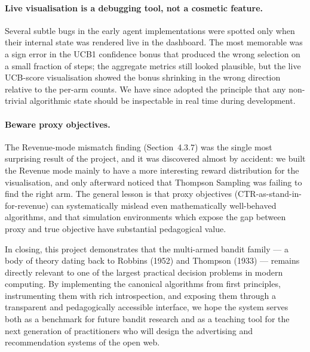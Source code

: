 \paragraph{Live visualisation is a debugging tool, not a cosmetic feature.}
Several subtle bugs in the early agent implementations were spotted only when their internal state was rendered live in the dashboard. The most memorable was a sign error in the UCB1 confidence bonus that produced the wrong selection on a small fraction of steps; the aggregate metrics still looked plausible, but the live UCB-score visualisation showed the bonus shrinking in the wrong direction relative to the per-arm counts. We have since adopted the principle that any non-trivial algorithmic state should be inspectable in real time during development.

\paragraph{Beware proxy objectives.}
The Revenue-mode mismatch finding (Section~4.3.7) was the single most surprising result of the project, and it was discovered almost by accident: we built the Revenue mode mainly to have a more interesting reward distribution for the visualisation, and only afterward noticed that Thompson Sampling was failing to find the right arm. The general lesson is that proxy objectives (CTR-as-stand-in-for-revenue) can systematically mislead even mathematically well-behaved algorithms, and that simulation environments which expose the gap between proxy and true objective have substantial pedagogical value.

In closing, this project demonstrates that the multi-armed bandit family --- a body of theory dating back to Robbins (1952) and Thompson (1933) --- remains directly relevant to one of the largest practical decision problems in modern computing. By implementing the canonical algorithms from first principles, instrumenting them with rich introspection, and exposing them through a transparent and pedagogically accessible interface, we hope the system serves both as a benchmark for future bandit research and as a teaching tool for the next generation of practitioners who will design the advertising and recommendation systems of the open web.
\newpage

